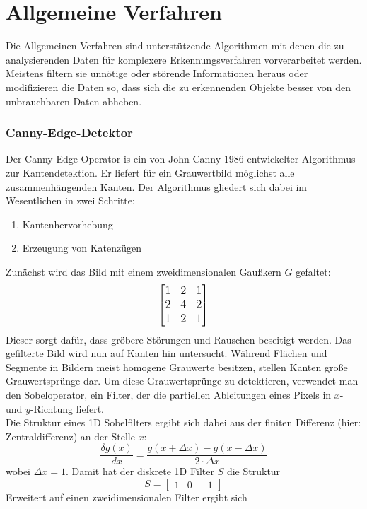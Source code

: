 
\chapter{Allgemeine Verfahren}
\label{chap:k3}
Die Allgemeinen Verfahren sind unterstützende Algorithmen mit denen die zu analysierenden Daten für komplexere Erkennungsverfahren vorverarbeitet werden. Meistens filtern sie unnötige oder störende Informationen heraus oder modifizieren die Daten so, dass sich die zu erkennenden Objekte besser von den unbrauchbaren Daten abheben.
	\subsection {Canny-Edge-Detektor}
		Der Canny-Edge Operator is ein von John Canny 1986 entwickelter Algorithmus zur Kantendetektion. Er liefert für ein Grauwertbild möglichst alle zusammenhängenden Kanten. Der Algorithmus gliedert sich dabei im Wesentlichen in zwei Schritte:
\begin{enumerate}
	\item Kantenhervorhebung
	\item Erzeugung von Katenzügen
\end{enumerate}

Zunächst wird das Bild mit einem zweidimensionalen Gaußkern $G$ gefaltet:
{\[\large \begin{bmatrix}
1 & 2 & 1\\ 
2 & 4 & 2 \\ 
1 & 2 & 1
\end{bmatrix}\]}
Dieser sorgt dafür, dass gröbere Störungen und Rauschen beseitigt werden.
Das gefilterte Bild wird nun auf Kanten hin untersucht. Während Flächen und Segmente in Bildern meist homogene Grauwerte besitzen, stellen Kanten große Grauwertsprünge dar. Um diese Grauwertsprünge zu detektieren, verwendet man den Sobeloperator, ein Filter, der die partiellen Ableitungen eines Pixels in $x$- und $y$-Richtung liefert. \\
Die Struktur eines 1D Sobelfilters ergibt sich dabei aus der finiten Differenz (hier: Zentraldifferenz) an der Stelle $x$:
\begin{equation*}
\frac{\delta g(x)}{dx} = \frac{g(x + \Delta x) - g(x - \Delta x)}{2 \cdot \Delta x }
\end{equation*}
wobei $\Delta x = 1$. Damit hat der diskrete 1D Filter $S$ die Struktur
\begin{equation*}
S = \begin{bmatrix}
1 & 0 & -1
\end{bmatrix}
\end{equation*}
Erweitert auf einen zweidimensionalen Filter ergibt sich

